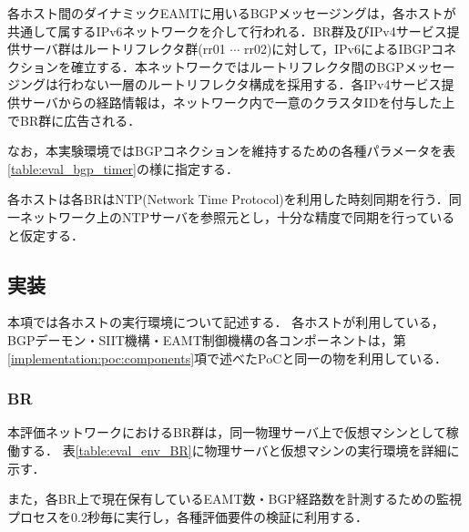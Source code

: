 各ホスト間のダイナミックEAMTに用いるBGPメッセージングは，各ホストが共通して属するIPv6ネットワークを介して行われる．BR群及びIPv4サービス提供サーバ群はルートリフレクタ群(rr01 $\cdots$ rr02)に対して，IPv6によるIBGPコネクションを確立する．本ネットワークではルートリフレクタ間のBGPメッセージングは行わない一層のルートリフレクタ構成を採用する．各IPv4サービス提供サーバからの経路情報は，ネットワーク内で一意のクラスタIDを付与した上でBR群に広告される．

なお，本実験環境ではBGPコネクションを維持するための各種パラメータを表\ref{table:eval_bgp_timer}の様に指定する．

各ホストは各BRはNTP(Network Time Protocol)\cite{RFC5905}を利用した時刻同期を行う．同一ネットワーク上のNTPサーバを参照元とし，十分な精度で同期を行っていると仮定する．


\begin{table}[]
    \label{table:eval_bgp_timer}
    \caption{BGPコネクションで利用したパラメータ}
    \centering
\end{table}

\subsection{実装}
本項では各ホストの実行環境について記述する．
各ホストが利用している，BGPデーモン・SIIT機構・EAMT制御機構の各コンポーネントは，第\ref{implementation:poc:components}項で述べたPoCと同一の物を利用している．


\subsubsection{BR}
本評価ネットワークにおけるBR群は，同一物理サーバ上で仮想マシンとして稼働する．
表\ref{table:eval_env_BR}に物理サーバと仮想マシンの実行環境を詳細に示す．

また，各BR上で現在保有しているEAMT数・BGP経路数を計測するための監視プロセスを0.2秒毎に実行し，各種評価要件の検証に利用する．

